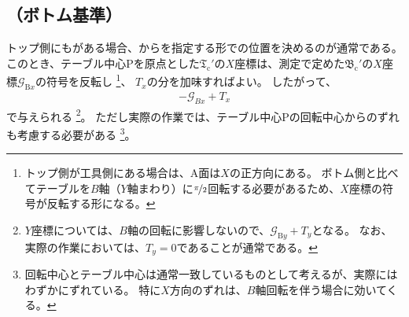 \subsection{\TopOutcutCenter（ボトム基準）}
\expandafterindex{\yomiTopOutcut@\nameTopOutcut}トップ側にも\nameOutcut がある場合、\BottomOutcutCenter から\CenterlineEndFaceDif を指定する形で\TopOutcutCenter の位置を決めるのが通常である。
このとき、テーブル中心Pを原点とした\TopOutcutCenter$\mathfrak T_\mathrm c'$の$X$座標は、測定で定めた$\mathfrak B_\mathrm c'$の$X$座標$\mathcal G_{\mathrm Bx}$の符号を反転し
\footnote{トップ側が工具側にある場合は、A面は$X$の正方向にある。
ボトム側と比べてテーブルを$B$軸（$Y$軸まわり）に$\nicefrac\pi2$回転する必要があるため、$X$座標の符号が反転する形になる。}、
\CenterlineEndFaceDifAC$T_x$の分を加味すればよい。
したがって、
\begin{align}
  \label{eq:BbasedTx}
  -\mathcal G_{Bx}+T_x
\end{align}
で与えられる
\footnote{$Y$座標については、$B$軸の回転に影響しないので、$\mathcal G_{\mathrm By}+T_y$となる。
なお、実際の作業においては、$T_y = 0$であることが通常である。}。
ただし実際の作業では、テーブル中心Pの回転中心からのずれも考慮する必要がある
\footnote{回転中心とテーブル中心は通常一致しているものとして考えるが、実際にはわずかにずれている。
特に$X$方向のずれは、$B$軸回転を伴う場合に効いてくる。}。



\clearpage
\modHeadsection{\TopOutcutCenter}


